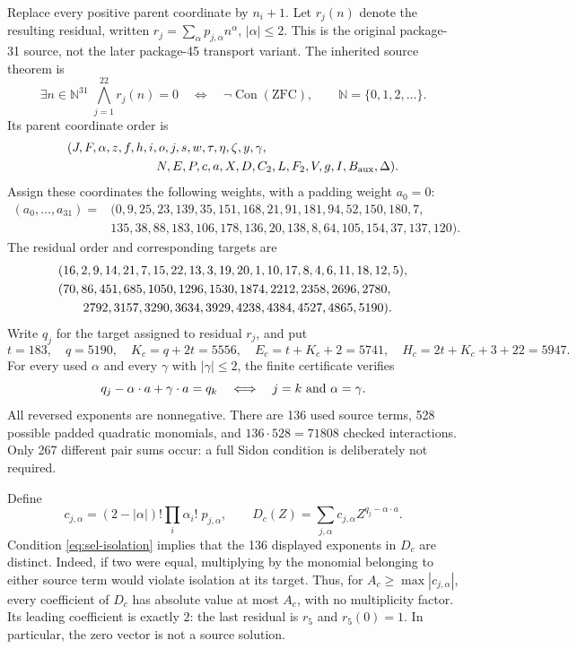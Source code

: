 Replace every positive parent coordinate by $n_i+1$. Let $r_j(n)$ denote
the resulting residual, written $r_j=\sum_\alpha p_{j,\alpha}n^\alpha$,
$|\alpha|\le2$. This is the original package-31 source, not the later
package-45 transport variant. The inherited source theorem is
\[
 \exists n\in\mathbb N^{31}\;\bigwedge_{j=1}^{22}r_j(n)=0
 \quad\Longleftrightarrow\quad\neg\operatorname{Con}(\mathrm{ZFC}),
 \qquad \mathbb N=\{0,1,2,\ldots\}.
\]
Its parent coordinate order is
\[
\begin{split}
 &(J,F,\alpha,z,f,h,i,o,j,s,w,\tau,\eta,\zeta,y,\gamma,\\
 &\hspace{25mm}N,E,P,c,a,X,D,C_2,L,F_2,V,g,I,B_{\rm aux},\Delta).
\end{split}
\]
Assign these coordinates the following weights, with a padding weight $a_0=0$:
\[
\begin{split}
(a_0,\ldots,a_{31})={}&(0,9,25,23,139,35,151,168,21,91,181,94,52,150,180,7,\\
 &135,38,88,183,106,178,136,20,138,8,64,105,154,37,137,120).
\end{split}
\]
The residual order and corresponding targets are
\[
\begin{split}
 &(16,2,9,14,21,7,15,22,13,3,19,20,1,10,17,8,4,6,11,18,12,5),\\
 &(70,86,451,685,1050,1296,1530,1874,2212,2358,2696,2780,\\
 &\hspace{7mm}2792,3157,3290,3634,3929,4238,4384,4527,4865,5190).
\end{split}
\]
Write $q_j$ for the target assigned to residual $r_j$, and put
\[
 t=183,\quad q=5190,\quad K_c=q+2t=5556,\quad E_c=t+K_c+2=5741,
 \quad H_c=2t+K_c+3+22=5947.
\]
For every used $\alpha$ and every $\gamma$ with $|\gamma|\le2$, the
finite certificate verifies
\begin{equation}\label{eq:sel-isolation}
 q_j-\alpha\cdot a+\gamma\cdot a=q_k
 \quad\Longleftrightarrow\quad j=k\ \hbox{and}\ \alpha=\gamma.
\end{equation}
All reversed exponents are nonnegative. There are 136 used source terms,
528 possible padded quadratic monomials, and $136\cdot528=71808$ checked
interactions. Only 267 different pair sums occur: a full Sidon condition
is deliberately not required.

Define
\[
 c_{j,\alpha}=(2-|\alpha|)!\prod_i\alpha_i!\;p_{j,\alpha},\qquad
 D_c(Z)=\sum_{j,\alpha}c_{j,\alpha}Z^{q_j-\alpha\cdot a}.
\]
Condition \eqref{eq:sel-isolation} implies that the 136 displayed exponents
in $D_c$ are distinct. Indeed, if two were equal, multiplying by the
monomial belonging to either source term would violate isolation at its
target. Thus, for $A_c\ge\max|c_{j,\alpha}|$, every coefficient of $D_c$
has absolute value at most $A_c$, with no multiplicity factor.
Its leading coefficient is exactly $2$: the last residual is $r_5$ and
$r_5(0)=1$. In particular, the zero vector is not a source solution.

